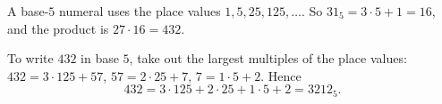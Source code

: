 A base-$5$ numeral uses the place values $1,5,25,125,\ldots$. So $31_5=3\cdot5+1=16$, and the product is $27\cdot16=432$.

To write $432$ in base $5$, take out the largest multiples of the place values: $432=3\cdot125+57$, $57=2\cdot25+7$, $7=1\cdot5+2$. Hence
\[
432=3\cdot125+2\cdot25+1\cdot5+2=\boxed{3212_5}.
\]
